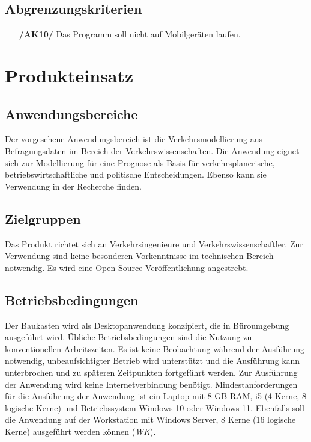 \documentclass{article}
\begin{document}
\subsection{Abgrenzungskriterien}
\begin{itemize}
    \item[\textbf{/AK10/}] Das Programm soll nicht auf Mobilgeräten laufen.
\end{itemize}


\clearpage
\section{Produkteinsatz}
\subsection{Anwendungsbereiche}
Der vorgesehene Anwendungsbereich ist die Verkehrsmodellierung aus Befragungsdaten im Bereich der Verkehrswissenschaften. Die Anwendung eignet sich zur Modellierung für eine Prognose als Basis für verkehrsplanerische, betriebswirtschaftliche und politische Entscheidungen. Ebenso kann sie Verwendung in der Recherche finden.

\subsection{Zielgruppen}
Das Produkt richtet sich an Verkehrsingenieure und Verkehrswissenschaftler. Zur Verwendung sind keine besonderen Vorkenntnisse im technischen Bereich notwendig.\newline 
Es wird eine Open Source Veröffentlichung angestrebt.
  
\subsection{Betriebsbedingungen}
Der Baukasten wird als Desktopanwendung konzipiert, die in Büroumgebung ausgeführt wird. Übliche Betriebsbedingungen sind die Nutzung zu konventionellen Arbeitszeiten. Es ist keine Beobachtung während der Ausführung notwendig, unbeaufsichtigter Betrieb wird unterstützt und die Ausführung kann unterbrochen und zu späteren Zeitpunkten fortgeführt werden. Zur Ausführung der Anwendung wird keine Internetverbindung benötigt.
Mindestanforderungen für die Ausführung der Anwendung ist ein Laptop mit 8 GB RAM, i5 (4 Kerne, 8 logische Kerne) und Betriebssystem Windows 10 oder Windows 11. Ebenfalls soll die Anwendung auf der Workstation mit Windows Server, 8 Kerne (16 logische Kerne) ausgeführt werden können (\textit{WK}).
\end{document}
